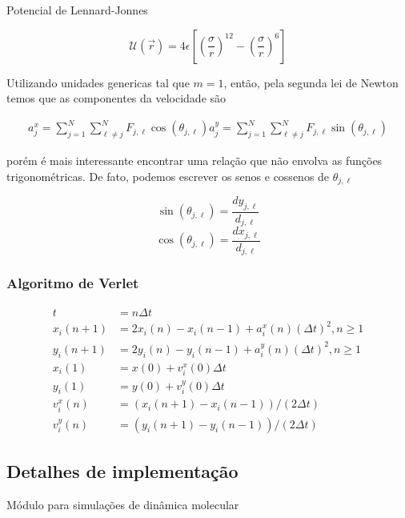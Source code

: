 Potencial de Lennard-Jonnes

\begin{equation}
    \mathcal{U}(\vec{r}) = 4 \epsilon \left[ \left(\frac{\sigma}{r} \right)^12 - \left(\frac{\sigma}{r}\right)^6 \right]
    \label{eq:potencial_lanner_jones}
\end{equation}

Utilizando unidades genericas tal que $m=1$, então, pela segunda lei de Newton temos que as componentes 
da velocidade são  

\begin{align}
    a^{x}_{j} = \sum_{j = 1}^{N} \sum_{\ell \neq j}^{N} F_{j, \ell} \cos(\theta_{j, \ell})
    a^{y}_{j} = \sum_{j = 1}^{N} \sum_{\ell \neq j}^{N} F_{j, \ell} \sin(\theta_{j, \ell})
\end{align}

porém é mais interessante encontrar uma relação que não envolva as funções trigonométricas. De fato, 
podemos escrever os senos e cossenos de $\theta_{j, \ell}$ 


$$ \sin(\theta_{j, \ell}) = \frac{dy_{j, \ell}}{d_{j, \ell}} $$
$$ \cos(\theta_{j, \ell}) = \frac{dx_{j, \ell}}{d_{j, \ell}} $$


\subsubsection{Algoritmo de Verlet}

\begin{align}
    t &= n \Delta t \\ 
    x_i(n+1) &= 2 x_i (n) - x_i (n-1)+ a_i^x (n) (\Delta t)^2, n \ge 1 \\ 
    y_i(n+1) &= 2 y_i (n) - y_i (n-1)+ a_i^y (n) (\Delta t)^2, n \ge 1 \\  
    x_i(1) &= x(0) + v_i^x (0) \Delta t \\ 
    y_i(1) &= y(0) + v_i^y (0) \Delta t \\ 
    v_i^x (n) &= \left( x_i(n+1) - x_i(n-1) \right) /(2 \Delta t)\\
    v_i^y (n) &= \left(  y_i(n+1) - y_i(n-1) \right) /(2 \Delta t)
\end{align}
\subsection{Detalhes de implementação}

Módulo para simulações de dinâmica molecular
